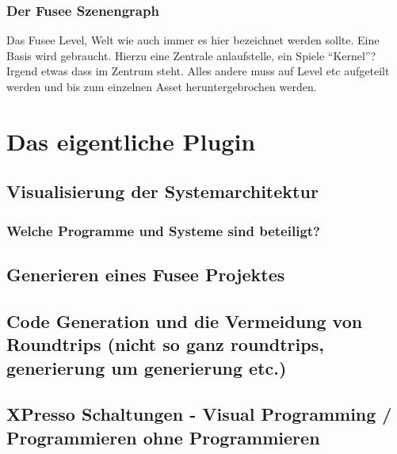 \documentclass[pagesize, paper=a4, fontsize=12pt,titlepage=true, headings=small, headnosepline, abstractoff, liststotoc, nochapterprefix, plainheadsepline, twoside]{scrreprt}
\begin{document}
\subsubsection{Der Fusee Szenengraph}
Das Fusee Level, Welt wie auch immer es hier bezeichnet werden sollte. Eine Basis wird gebraucht. Hierzu eine Zentrale anlaufstelle, ein Spiele “Kernel”? Irgend etwas dass im Zentrum steht.
Alles andere muss auf Level etc aufgeteilt werden und bis zum einzelnen Asset heruntergebrochen werden.

\section{Das eigentliche Plugin}
\subsection{Visualisierung der Systemarchitektur}
\subsubsection{Welche Programme und Systeme sind beteiligt?}
\subsection{Generieren eines Fusee Projektes}
\subsection{Code Generation und die Vermeidung von Roundtrips (nicht so ganz roundtrips, generierung um generierung etc.)}
\subsection{XPresso Schaltungen - Visual Programming / Programmieren ohne Programmieren}
\end{document}
